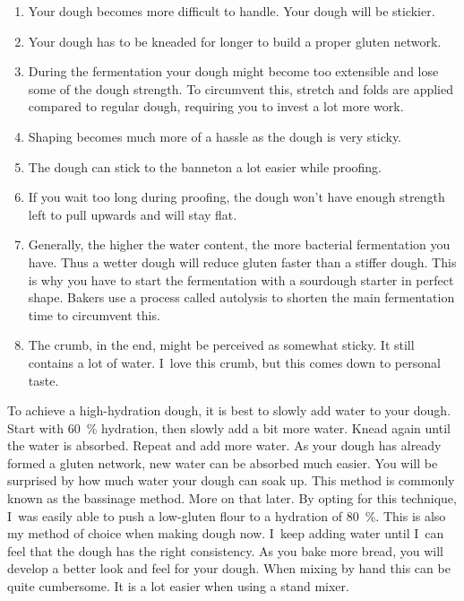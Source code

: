 \begin{enumerate}
  \item Your dough becomes more difficult to handle. Your dough will be stickier.
  \item Your dough has to be kneaded for longer to build a proper gluten
    network.
  \item During the fermentation your dough might become too extensible and lose
    some of the dough strength. To circumvent this, stretch and folds are applied
    compared to regular dough,
    requiring you to invest a lot more work.
  \item Shaping becomes much more of a hassle as the dough is very sticky.
  \item The dough can stick to the banneton a lot easier while proofing.
  \item If you wait too long during proofing, the dough won't have enough strength
    left to pull upwards and will stay flat.
  \item Generally, the higher the water content, the more bacterial fermentation you
    have. Thus a wetter dough will reduce gluten faster than a stiffer dough.
    This is why you have to start the fermentation with a sourdough starter in
    perfect shape. Bakers use a process called autolysis to shorten the main
    fermentation time to circumvent this.
  \item The crumb, in the end, might be perceived as somewhat sticky. It still
    contains a lot of water. I~love this crumb, but this comes down to personal
    taste.
\end{enumerate}

To achieve a high-hydration dough, it is best to slowly add water to
your dough. Start with \qty{60}{\percent} hydration, then slowly add a bit more water. Knead
again until the water is absorbed. Repeat and add more water. As your dough
has already formed a gluten network, new water can be absorbed much easier.
You will be surprised by how much water your dough can soak up. This
method is commonly known as the bassinage method. More on that later.
By opting for this technique, I~was easily able to push a low-gluten flour
to a hydration of \qty{80}{\percent}. This
is also my method of choice when making dough now. I~keep adding water until
I~can feel that the dough has the right consistency. As you bake more bread,
you will develop a better look and feel for your dough. When mixing
by hand this can be quite cumbersome. It is a lot easier when using a stand
mixer.

